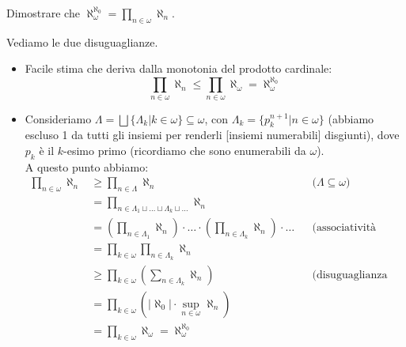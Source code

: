 \begin{exercise}
	Dimostrare che $\aleph_\omega^{\aleph_0} = \prod_{n \in \omega} \aleph_n$.
\end{exercise}

\begin{soln}
	Vediamo le due disuguaglianze.
	\begin{itemize}
		\item[$\boxed{\geq}$] Facile stima che deriva dalla monotonia del prodotto cardinale:
		\[ \prod_{n \in \omega} \aleph_n \leq \prod_{n \in \omega} \aleph_\omega = \aleph_\omega^{\aleph_0}
			\]
		\item[$\boxed{\leq}$] Consideriamo $\Lambda = \bigsqcup \{\Lambda_k | k \in \omega\} \subseteq \omega$, con $\Lambda_k = \{p_k^{n+1} | n \in \omega\}$ (abbiamo escluso 1 da tutti gli insiemi per renderli [insiemi numerabili] disgiunti), dove $p_k$ \`e il $k$-esimo primo (ricordiamo che sono enumerabili da $\omega$).\\
		A questo punto abbiamo:
		\begin{align*}
			\prod_{n \in \omega} \aleph_n &\geq \prod_{n \in \Lambda} \aleph_n &&\text{($\Lambda \subseteq \omega$)} \\
			&= \prod_{n \in \Lambda_1 \sqcup \ldots \sqcup \Lambda_k \sqcup \ldots} \aleph_n \\
			&= \left(\prod_{n \in \Lambda_1}\aleph_n\right)\cdot\ldots\cdot\left(\prod_{n \in \Lambda_k}\aleph_n\right)\cdot\ldots &&\text{(associativit\`a infinita)} \\
			&=\prod_{k \in \omega}\prod_{n \in \Lambda_k}\aleph_n \\
			&\geq \prod_{k \in \omega}\left(\sum_{n \in \Lambda_k}\aleph_n\right) &&\text{(disuguaglianza somma-prodotto)} \\
			&= \prod_{k \in \omega}\left(|\aleph_0| \cdot \sup_{n \in \omega}\aleph_n\right) \\
			&= \prod_{k \in \omega}\aleph_\omega = \aleph_\omega^{\aleph_0}
		\end{align*}
	\end{itemize}
\end{soln}

